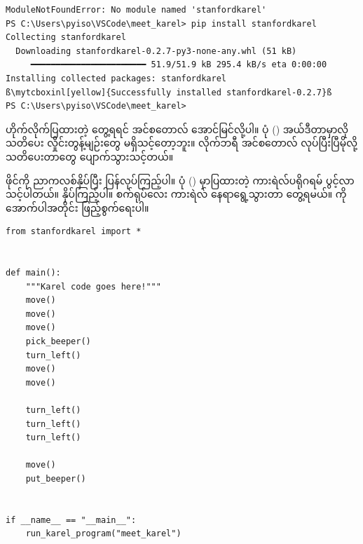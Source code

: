 %
\begin{verbatim}
ModuleNotFoundError: No module named 'stanfordkarel'
PS C:\Users\pyiso\VSCode\meet_karel> pip install stanfordkarel
Collecting stanfordkarel
  Downloading stanfordkarel-0.2.7-py3-none-any.whl (51 kB)
     ━━━━━━━━━━━━━━━━━━━━━━━ 51.9/51.9 kB 295.4 kB/s eta 0:00:00
Installing collected packages: stanfordkarel
ß\mytcboxinl[yellow]{Successfully installed stanfordkarel-0.2.7}ß
PS C:\Users\pyiso\VSCode\meet_karel> 
\end{verbatim}
%
ဟိုက်လိုက်ပြထားတဲ့  တွေ့ရရင် အင်စတောလ် အောင်မြင်လို့ပါ။ ပုံ (\fRefNo{\ref{fig:edtmtkrl}}) အယ်ဒီတာမှာလို သတိပေး လှိုင်းတွန့်မျဉ်းတွေ မရှိသင့်တော့ဘူး။  လိုက်ဘရီ အင်စတောလ် လုပ်ပြီးပြီမိုလို့ သတိပေးတာတွေ ပျောက်သွားသင့်တယ်။


 ဖိုင်ကို ညာကလစ်နှိပ်ပြီး  ပြန်လုပ်ကြည့်ပါ။ ပုံ (\fRefNo{\ref{fig:mtkrlprgm}}) မှာပြထားတဲ့ ကားရဲလ်ပရိုဂရမ် ပွင့်လာသင့်ပါတယ်။  နှိပ်ကြည့်ပါ။ စက်ရုပ်လေး ကားရဲလ် နေရာရွေ့သွားတာ တွေ့ရမယ်။  ကို အောက်ပါအတိုင်း ဖြည့်စွက်ရေးပါ။
\begin{figure}[tbh!]
\caption{} 
\label{fig:mtkrlprgm}
\end{figure}


%
\setlength{\fboxsep}{0pt}
\begin{verbatim}
from stanfordkarel import *


def main():
    """Karel code goes here!"""
    move()
    move()
    move()
    pick_beeper()
    turn_left()
    move()
    move()

    turn_left()
    turn_left()
    turn_left()

    move()
    put_beeper()


if __name__ == "__main__":
    run_karel_program("meet_karel")
\end{verbatim}
%

